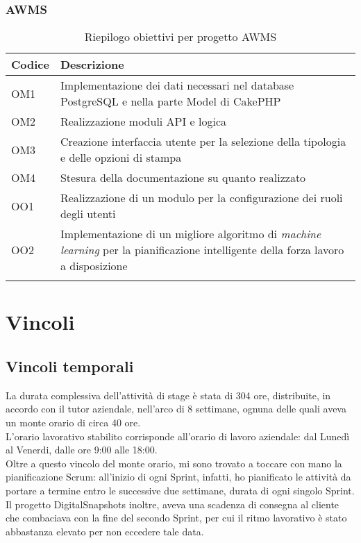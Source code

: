 \subsubsection*{AWMS}
\begin{center}
	\renewcommand{\arraystretch}{1.5}
	\begin{longtable}{ | p{0.1\linewidth} | p{0.9\linewidth} |}	 
		\hline   
	    \rowcolor{header}\textbf{Codice}&\textbf{Descrizione}\\
		\hline   	
    	OM1 & Implementazione dei dati necessari nel database PostgreSQL e nella parte Model di CakePHP \\
    	OM2 & Realizzazione moduli API e logica \\
    	OM3 & Creazione interfaccia utente per la selezione della tipologia e delle opzioni di stampa \\
    	OM4 & Stesura della documentazione su quanto realizzato \\
    	OO1 & Realizzazione di un modulo per la configurazione dei ruoli degli utenti \\
    	OO2 & Implementazione di un migliore algoritmo di \textit{machine learning} per la pianificazione intelligente della forza lavoro a disposizione \\
    	\hline
    	\rowcolor{white}
    	\caption{Riepilogo obiettivi per progetto AWMS}
	\end{longtable}
	\label{tab:obiettivi-AWMS}
\end{center}

\section{Vincoli}
\subsection{Vincoli temporali}

La durata complessiva dell'attività di stage è stata di 304 ore, distribuite, in accordo con il tutor aziendale, nell'arco di 8 settimane, ognuna delle quali aveva un monte orario di circa 40 ore. \\
L'orario lavorativo stabilito corrisponde all'orario di lavoro aziendale: dal Lunedì al Venerdi, dalle ore 9:00 alle 18:00.\\
Oltre a questo vincolo del monte orario, mi sono trovato a toccare con mano la pianificazione Scrum: all'inizio di ogni Sprint, infatti, ho pianificato le attività da portare a termine entro le successive due settimane, durata di ogni singolo Sprint.\\
Il progetto DigitalSnapshots inoltre, aveva una scadenza di consegna al cliente che combaciava con la fine del secondo Sprint, per cui il ritmo lavorativo è stato abbastanza elevato per non eccedere tale data.

